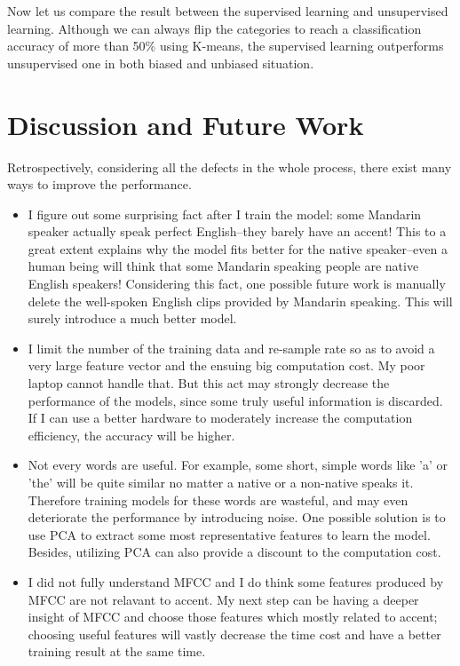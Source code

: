\documentclass{sig-alternate}
\begin{document}
Now let us compare the result between the supervised learning and unsupervised learning. Although we can always flip the categories to reach a classification accuracy of more than 50\% using K-means, the supervised learning outperforms unsupervised one in both biased and unbiased situation.


\section{Discussion and Future Work}


Retrospectively, considering all the defects in the whole process, there exist many ways to improve the performance. 

\begin{itemize}
    \item I figure out some surprising fact after I train the model: some Mandarin speaker actually speak perfect English--they barely have an accent! This to a great extent explains why the model fits better for the native speaker--even a human being will think that some Mandarin speaking people are native English speakers! Considering this fact, one possible future work is manually delete the well-spoken English clips provided by Mandarin speaking. This will surely introduce a much better model.
	\item I limit the number of the training data and re-sample rate so as to avoid a very large feature vector and the ensuing big computation cost. My poor laptop cannot handle that. But this act may strongly decrease the performance of the models, since some truly useful information is discarded. If I can use a better hardware to moderately increase the computation efficiency, the accuracy will be higher.
    \item Not every words are useful. For example, some short, simple words like 'a' or 'the' will be quite similar no matter a native or a non-native speaks it. Therefore training models for these words are wasteful, and may even deteriorate the performance by introducing noise. One possible solution is to use PCA to extract some most representative features to learn the model. Besides, utilizing PCA can also provide a discount to the computation cost.
    \item I did not fully understand MFCC and I do think some features produced by MFCC are not relavant to accent. My next step can be having a deeper insight of MFCC and choose those features which mostly related to accent; choosing useful features will vastly decrease the time cost and have a better training result at the same time.

\end{itemize}
\end{document}
